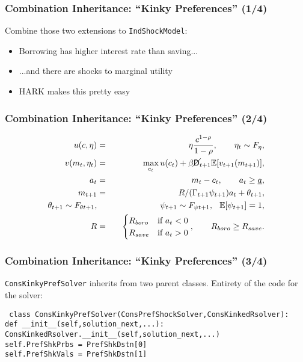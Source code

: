 \documentclass[11pt,handout]{beamer}
\newcommand{\E}{\mathbb{E}}
\newcommand{\Die}{\mathsf{D}}
\newcommand{\Live}{\cancel{\Die}}
\begin{document}
\begin{frame}
\frametitle{Combination Inheritance: ``Kinky Preferences'' (1/4)}
Combine those two extensions to \texttt{IndShockModel}:
\begin{itemize}
\item Borrowing has higher interest rate than saving...

\item ...and there are shocks to marginal utility

\item HARK makes this pretty easy
\end{itemize}
\end{frame}

\begin{frame}
\frametitle{Combination Inheritance: ``Kinky Preferences'' (2/4)}
\begin{eqnarray*}
u(c,\eta) &=& \eta \frac{c^{1-\rho}}{1-\rho}, \qquad \eta_t \sim F_{\eta},\\
v(m_t,\eta_t) &=& \max_{c_t} u(c_t) + \beta \Live_{t+1} \E [v_{t+1}(m_{t+1}) ], \\
a_t &=& m_t - c_t, \qquad a_t \geq \underline{a}, \\
m_{t+1} &=& R/(\Gamma_{t+1} \psi_{t+1}) a_t + \theta_{t+1}, \\
\theta_{t+1} \sim F_{\theta t+1}, &\qquad& \psi_{t+1} \sim F_{\psi t+1}, \hspace{0.25cm} \E[\psi_{t+1}] = 1, \\
R &=& \begin{cases}
R_{boro} & \text{if  } a_t < 0 \\
R_{save} & \text{if  } a_t > 0
\end{cases}, \qquad R_{boro} \geq R_{save}.
\end{eqnarray*}
\end{frame}

\begin{frame}
\frametitle{Combination Inheritance: ``Kinky Preferences'' (3/4)}
\texttt{ConsKinkyPrefSolver} inherits from two parent classes.  Entirety of the code for the solver:

\scriptsize{
\texttt{
class ConsKinkyPrefSolver(ConsPrefShockSolver,ConsKinkedRsolver):\\
\qquad def \_\_init\_\_(self,solution\_next,...):\\
\qquad \qquad ConsKinkedRsolver.\_\_init\_\_(self,solution\_next,...)\\
\qquad \qquad self.PrefShkPrbs = PrefShkDstn[0]\\
\qquad \qquad self.PrefShkVals = PrefShkDstn[1]\\
}}
\end{frame}
\end{document}
